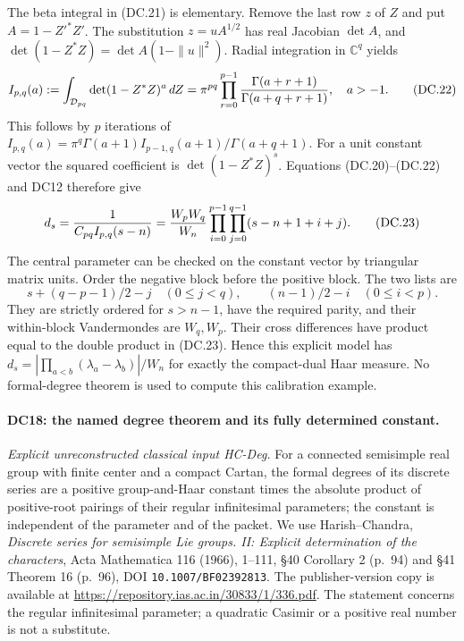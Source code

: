 The beta integral in (DC.21) is elementary.  Remove the last row
$z$ of $Z$ and put $A=1-Z'^*Z'$.  The substitution $z=uA^{1/2}$
has real Jacobian $\det A$, and
$\det(1-Z^*Z)=\det A(1-\|u\|^2)$.  Radial integration in
$\mathbb C^q$ yields
\[
 I_{p,q}(a):=\int_{\mathcal D_{pq}}\det(1-Z^*Z)^a\,dZ
 =\pi^{pq}\prod_{r=0}^{p-1}{\Gamma(a+r+1)\over\Gamma(a+q+r+1)},
 \quad a>-1.                                                  \tag{DC.22}
\]
This follows by $p$ iterations of
$I_{p,q}(a)=\pi^q\Gamma(a+1)I_{p-1,q}(a+1)/\Gamma(a+q+1)$.
For a unit constant vector the squared coefficient is
$\det(1-Z^*Z)^s$.  Equations (DC.20)--(DC.22) and DC12 therefore give
\[
 d_s={1\over C_{pq}I_{p,q}(s-n)}
       ={W_pW_q\over W_n}
          \prod_{i=0}^{p-1}\prod_{j=0}^{q-1}(s-n+1+i+j).       \tag{DC.23}
\]
The central parameter can be checked on the constant vector by
triangular matrix units.  Order the negative block before the
positive block.  The two lists are
\[
 s+(q-p-1)/2-j\quad(0\le j<q),\qquad
 (n-1)/2-i\quad(0\le i<p).
\]
They are strictly ordered for $s>n-1$, have the required parity,
and their within-block Vandermondes are $W_q,W_p$.
Their cross differences have product equal to the double product
in (DC.23).  Hence this explicit model has
$d_s=|\prod_{a<b}(\lambda_a-\lambda_b)|/W_n$ for exactly the
compact-dual Haar measure.  No formal-degree theorem is used to
compute this calibration example.

\paragraph{DC18: the named degree theorem and its fully determined constant.}
\label{claim:DC18}
\emph{Explicit unreconstructed classical input HC-Deg.}
For a connected semisimple real group with finite center and a
compact Cartan, the formal degrees of its discrete series are a
positive group-and-Haar constant times the absolute product of
positive-root pairings of their regular infinitesimal parameters;
the constant is independent of the parameter and of the packet.
We use Harish--Chandra, \emph{Discrete series for semisimple Lie
groups. II: Explicit determination of the characters}, Acta
Mathematica 116 (1966), 1--111, \S40 Corollary 2 (p.~94) and
\S41 Theorem 16 (p.~96), DOI \texttt{10.1007/BF02392813}.
The publisher-version copy is available at
\url{https://repository.ias.ac.in/30833/1/336.pdf}.
The statement concerns the regular infinitesimal parameter; a
quadratic Casimir or a positive real number is not a substitute.


